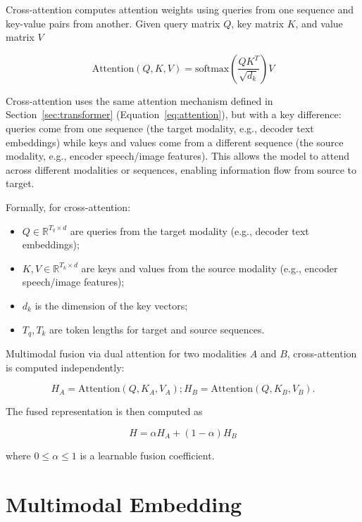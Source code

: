 Cross-attention computes attention weights using queries from one sequence and key-value pairs from another. Given query matrix $Q$, key matrix $K$, and value matrix $V$

\begin{equation*}
    \text{Attention}(Q, K, V) = \text{softmax}\left(\frac{QK^{T}}{\sqrt{d_k}}\right)V
\end{equation*}

Cross-attention uses the same attention mechanism defined in Section~\ref{sec:transformer} (Equation~\ref{eq:attention}), but with a key difference: queries come from one sequence (the target modality, e.g., decoder text embeddings) while keys and values come from a different sequence (the source modality, e.g., encoder speech/image features). This allows the model to attend across different modalities or sequences, enabling information flow from source to target. 

Formally, for cross-attention:

\begin{itemize}
    \item $Q \in \mathbb{R}^{T_q \times d}$ are queries from the target modality (e.g., decoder text embeddings);
    \item $K, V \in \mathbb{R}^{T_k \times d}$ are keys and values from the source modality (e.g., encoder speech/image features);
    \item $d_k$ is the dimension of the key vectors;
    \item $T_q, T_k$ are token lengths for target and source sequences.
\end{itemize}

Multimodal fusion via dual attention for two modalities $A$ and $B$, cross-attention is computed independently:

\[
    H_{A} = \text{Attention}(Q, K_{A}, V_{A});
    H_{B} = \text{Attention}(Q, K_{B}, V_{B}).
\]

The fused representation is then computed as

\begin{equation*}
    H = \alpha H_{A} + (1 - \alpha)H_{B}
\end{equation*}

where $0 \leq \alpha \leq 1$ is a learnable fusion coefficient.


\section{Multimodal Embedding}

